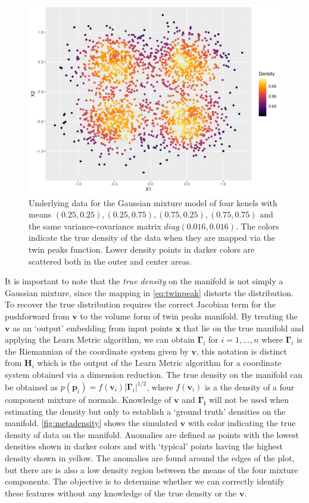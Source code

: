 \documentclass[11pt,a4paper,]{article}
\begin{document}
\begin{figure}

{\centering \includegraphics[width=0.8\linewidth]{figures/truedensity_twinpeaks_dc} 

}

\caption{Underlying data for the Gaussian mixture model of four kenels with means $(0.25, 0.25), (0.25, 0.75), (0.75, 0.25), (0.75, 0.75)$ and the same variance-covariance matrix $diag(0.016, 0.016)$. The colors indicate the true density of the data when they are mapped via the twin peaks function. Lower density points in darker colors are scattered both in the outer and center areas.}\label{fig:metadensity}
\end{figure}

It is important to note that the \emph{true density} on the manifold is not simply a Gaussian mixture, since the mapping in \autoref{eq:twinpeak} distorts the distribution. To recover the true distribution requires the correct Jacobian term for the pushforward from \(\pmb{v}\) to the volume form of twin peaks manifold. By treating the \(\pmb{v}\) as an `output' embedding from input points \(\pmb{x}\) that lie on the true manifold and applying the Learn Metric algorithm, we can obtain \(\pmb{\Gamma}_i\) for \(i=1,\dots,n\) where \(\pmb{\Gamma}_i\) is the Riemannian of the coordinate system given by \(\pmb{v}\), this notation is distinct from \(\pmb{H}_i\) which is the output of the Learn Metric algorithm for a coordinate system obtained via a dimension reduction. The true density on the manifold can be obtained as \(p(\pmb{p}_i)=f(\pmb{v}_i)|\pmb{\Gamma}_i|^{1/2}\), where \(f(\pmb{v}_i)\) is a the density of a four component mixture of normals. Knowledge of \(\pmb{v}\) and \(\pmb{\Gamma_i}\) will not be used when estimating the density but only to establish a `ground truth' densities on the manifold. \autoref{fig:metadensity} shows the simulated \(\pmb{v}\) with color indicating the true density of data on the manifold. Anomalies are defined as points with the lowest densities shown in darker colors and with `typical' points having the highest density shown in yellow. The anomalies are found around the edges of the plot, but there are is also a low density region between the means of the four mixture components. The objective is to determine whether we can correctly identify these features without any knowledge of the true density or the \(\pmb{v}\).
\end{document}

